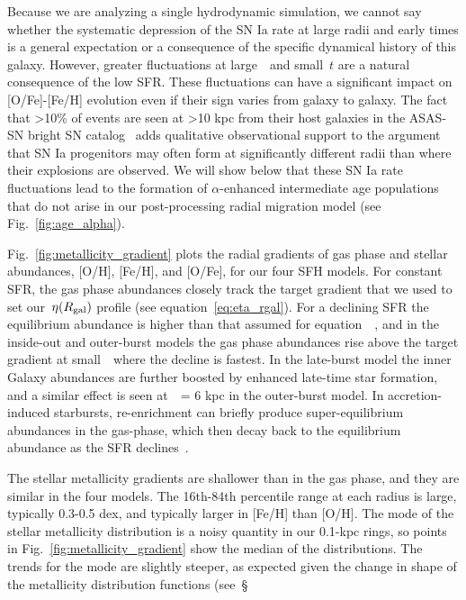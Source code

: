\documentclass[draft2.tex]{subfiles}
\begin{document}
Because we are analyzing a single hydrodynamic simulation, we cannot say 
whether the systematic depression of the SN Ia rate at large radii and early 
times is a general expectation or a consequence of the specific dynamical 
history of this galaxy. 
However, greater fluctuations at large~\rgal~and small~$t$ are a natural 
consequence of the low SFR. These fluctuations can have a significant impact 
on [O/Fe]-[Fe/H] evolution even if their sign varies from galaxy to galaxy. 
The fact that >10\% of events are seen at >10 kpc from their host galaxies in 
the ASAS-SN bright SN catalog~\citep{Holoien2019} adds qualitative 
observational support to the argument that SN Ia progenitors may often form at 
significantly different radii than where their explosions are observed. 
We will show below that these SN Ia rate fluctuations lead to the formation of 
$\alpha$-enhanced intermediate age populations that do not arise in our 
post-processing radial migration model (see Fig.~\ref{fig:age_alpha}). 
\par 
Fig.~\ref{fig:metallicity_gradient} plots the radial gradients of gas phase 
and stellar abundances, [O/H], [Fe/H], and [O/Fe], for our four SFH models. 
For constant SFR, the gas phase abundances closely track the target gradient 
that we used to set our~$\eta(R_\text{gal})$ profile (see equation~\ref{eq:eta_rgal}). 
For a declining SFR the equilibrium abundance is higher than that assumed for 
equation~~\citep[see][]{Weinberg2017}, and in the inside-out 
and outer-burst models the gas phase abundances rise above the target gradient 
at small~\rgal~where the decline is fastest. 
In the late-burst model the inner Galaxy abundances are further boosted by 
enhanced late-time star formation, and a similar effect is seen at~\rgal~= 6 
kpc in the outer-burst model. 
In accretion-induced starbursts, re-enrichment can briefly produce 
super-equilibrium abundances in the gas-phase, which then decay back to the 
equilibrium abundance as the SFR declines~\citep{Johnson2020}. 
\par 
The stellar metallicity gradients are shallower than in the gas phase, and 
they are similar in the four models. 
The 16th-84th percentile range at each radius is large, typically 0.3-0.5 
dex, and typically larger in [Fe/H] than [O/H]. 
The mode of the stellar metallicity distribution is a noisy quantity in our 
0.1-kpc rings, so points in Fig.~\ref{fig:metallicity_gradient} show the 
median of the distributions. 
The trends for the mode are slightly steeper, as expected given the change in 
shape of the metallicity distribution functions (see~\S 
\end{document}
